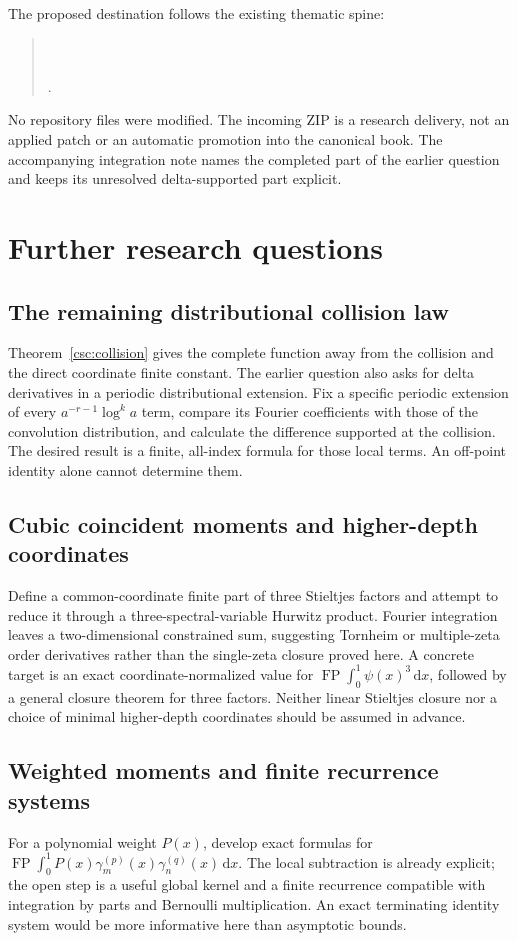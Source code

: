 \documentclass[11pt,a4paper]{article}
\numberwithin{equation}{section}
\theoremstyle{definition}
\newcommand{\dd}{\,\mathrm dx}
\newcommand{\FP}{\operatorname{FP}}
\begin{document}
The proposed destination follows the existing thematic spine:
\begin{quote}\small
{}\\
\\
.
\end{quote}
No repository files were modified. The incoming ZIP is a research delivery, not an applied patch or an automatic promotion into the canonical book. The accompanying integration note names the completed part of the earlier question and keeps its unresolved delta-supported part explicit.

\section{Further research questions}\label{csc:further}
\subsection{The remaining distributional collision law}
Theorem~\ref{csc:collision} gives the complete function away from the collision and the direct coordinate finite constant. The earlier question also asks for delta derivatives in a periodic distributional extension. Fix a specific periodic extension of every $a^{-r-1}\log^k a$ term, compare its Fourier coefficients with those of the convolution distribution, and calculate the difference supported at the collision. The desired result is a finite, all-index formula for those local terms. An off-point identity alone cannot determine them.

\subsection{Cubic coincident moments and higher-depth coordinates}
Define a common-coordinate finite part of three Stieltjes factors and attempt to reduce it through a three-spectral-variable Hurwitz product. Fourier integration leaves a two-dimensional constrained sum, suggesting Tornheim or multiple-zeta order derivatives rather than the single-zeta closure proved here. A concrete target is an exact coordinate-normalized value for
$\FP\int_0^1\psi(x)^3\dd$, followed by a general closure theorem for three factors. Neither linear Stieltjes closure nor a choice of minimal higher-depth coordinates should be assumed in advance.

\subsection{Weighted moments and finite recurrence systems}
For a polynomial weight $P(x)$, develop exact formulas for
$\FP\int_0^1P(x)\gamma_m^{(p)}(x)\gamma_n^{(q)}(x)\dd$.
The local subtraction is already explicit; the open step is a useful global kernel and a finite recurrence compatible with integration by parts and Bernoulli multiplication. An exact terminating identity system would be more informative here than asymptotic bounds.
\end{document}
